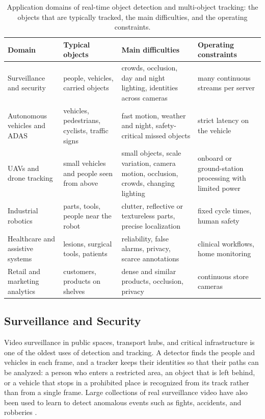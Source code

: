 \begin{table}[tbp]
\centering
\caption{Application domains of real-time object detection and multi-object tracking: the objects that are typically tracked, the main difficulties, and the operating constraints.}
\label{tab:bg-apps}
\footnotesize\setlength{\tabcolsep}{4pt}\renewcommand{\arraystretch}{1.25}
\begin{tabular}{>{\raggedright\arraybackslash}p{2.9cm}>{\raggedright\arraybackslash}p{3.2cm}>{\raggedright\arraybackslash}p{4.5cm}>{\raggedright\arraybackslash}p{3.5cm}}
\toprule
Domain & Typical objects & Main difficulties & Operating constraints\\
\midrule
Surveillance and security & people, vehicles, carried objects & crowds, occlusion, day and night lighting, identities across cameras & many continuous streams per server\\
Autonomous vehicles and ADAS & vehicles, pedestrians, cyclists, traffic signs & fast motion, weather and night, safety-critical missed objects & strict latency on the vehicle\\
UAVs and drone tracking & small vehicles and people seen from above & small objects, scale variation, camera motion, occlusion, crowds, changing lighting & onboard or ground-station processing with limited power\\
Industrial robotics & parts, tools, people near the robot & clutter, reflective or textureless parts, precise localization & fixed cycle times, human safety\\
Healthcare and assistive systems & lesions, surgical tools, patients & reliability, false alarms, privacy, scarce annotations & clinical workflows, home monitoring\\
Retail and marketing analytics & customers, products on shelves & dense and similar products, occlusion, privacy & continuous store cameras\\
\bottomrule
\end{tabular}
\end{table}

\subsection{Surveillance and Security}\label{sec:bg-app-surv}
Video surveillance in public spaces, transport hubs, and critical infrastructure is one of the oldest uses of detection and tracking. A detector finds the people and vehicles in each frame, and a tracker keeps their identities so that their paths can be analyzed: a person who enters a restricted area, an object that is left behind, or a vehicle that stops in a prohibited place is recognized from its track rather than from a single frame. Large collections of real surveillance video have also been used to learn to detect anomalous events such as fights, accidents, and robberies \cite{sultani2018anomaly}.

